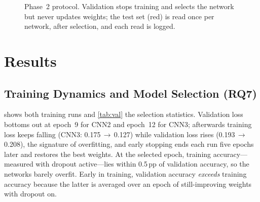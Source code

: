 \documentclass[conference]{IEEEtran}
\newcommand{\pp}{\,pp}                       %
\newcommand{\arrowc}{\,$\rightarrow$\,}
\begin{document}
\begin{figure}[t]
\centering
{}
\caption{Phase~2 protocol. Validation stops training and selects the network but never updates weights; the test set
(red) is read once per network, after selection, and each read is logged.}
\label{fig:protocol}
\end{figure}

\section{Results}
\label{sec:results}

\subsection{Training Dynamics and Model Selection (RQ7)}
 shows both training runs and \cref{tab:val} the selection statistics. Validation loss bottoms out at
epoch~9 for CNN2 and epoch~12 for CNN3; afterwards training loss keeps falling (CNN3: 0.175\arrowc0.127) while
validation loss rises (0.193\arrowc0.208), the signature of overfitting, and early stopping ends each run five epochs
later and restores the best weights. At the selected epoch, training accuracy---measured with dropout active---lies
within 0.5\pp{} of validation accuracy, so the networks barely overfit. Early in training, validation accuracy
\emph{exceeds} training accuracy because the latter is averaged over an epoch of still-improving weights with dropout on.
\end{document}
